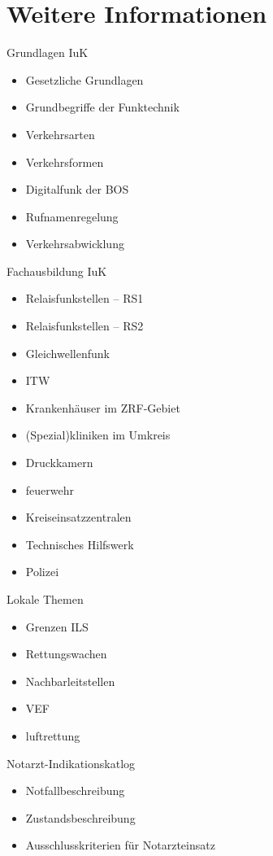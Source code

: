 \section{Weitere Informationen}
\begin{hintbox}{Grundlagen IuK}
    \begin{multicols}{2}
        \begin{itemize}
            \item Gesetzliche Grundlagen
            \item Grundbegriffe der Funktechnik
            \item Verkehrsarten
            \item Verkehrsformen
            \item Digitalfunk der BOS
            \item Rufnamenregelung
            \item Verkehrsabwicklung
        \end{itemize}
    \end{multicols}
\end{hintbox}   
\begin{hintbox}{Fachausbildung IuK}
    \begin{multicols}{2}
        \begin{itemize}
            \item Relaisfunkstellen -- RS1
            \item Relaisfunkstellen -- RS2
            \item Gleichwellenfunk
            \item ITW
            \item Krankenhäuser im ZRF-Gebiet
            \item (Spezial)kliniken im Umkreis
            \item Druckkamern
            \item feuerwehr
            \item Kreiseinsatzzentralen
            \item Technisches Hilfswerk
            \item Polizei
        \end{itemize}
    \end{multicols}
\end{hintbox}
\begin{hintbox}{Lokale Themen}
    \begin{multicols}{2}
        \begin{itemize}
            \item Grenzen ILS
            \item Rettungswachen
            \item Nachbarleitstellen
            \item VEF
            \item luftrettung
        \end{itemize}
    \end{multicols}
\end{hintbox}
\begin{hintbox}{Notarzt-Indikationskatlog}
    \begin{itemize}
        \item Notfallbeschreibung
        \item Zustandsbeschreibung
        \item Ausschlusskriterien für Notarzteinsatz
    \end{itemize}
\end{hintbox}